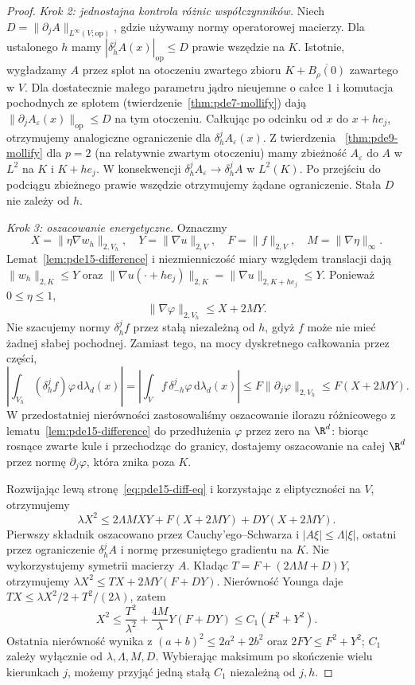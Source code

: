 \begin{proof}
\emph{Krok 2: jednostajna kontrola różnic współczynników.}
Niech $D=\|\partial_jA\|_{L^\infty(V;\mathrm{op})}$,
gdzie używamy normy operatorowej macierzy. Dla ustalonego
$h$ mamy $|\delta_h^jA(x)|_{\mathrm{op}}\le D$ prawie
wszędzie na $K$. Istotnie, wygładzamy $A$ przez splot
na otoczeniu zwartego zbioru $K+\overline{B_\rho(0)}$
zawartego w $V$. Dla dostatecznie małego parametru
jądro nieujemne o całce $1$ i komutacja pochodnych
ze splotem (twierdzenie~\ref{thm:pde7-mollify})
dają $\|\partial_j A_\varepsilon(x)\|_{\mathrm{op}}\le D$
na tym otoczeniu. Całkując po odcinku od $x$ do $x+he_j$,
otrzymujemy analogiczne ograniczenie dla
$\delta_h^j A_\varepsilon(x)$. Z twierdzenia
~\ref{thm:pde9-mollify} dla $p=2$ (na relatywnie zwartym
otoczeniu) mamy zbieżność $A_\varepsilon$ do $A$ w $L^2$
na $K$ i $K+he_j$. W konsekwencji
$\delta_h^j A_\varepsilon\to\delta_h^j A$ w $L^2(K)$.
Po przejściu do podciągu zbieżnego prawie wszędzie
otrzymujemy żądane ograniczenie. Stała $D$ nie zależy od $h$.

\emph{Krok 3: oszacowanie energetyczne.}
Oznaczmy
\[
 X=\|\eta\nabla w_h\|_{2,V_h},\quad
 Y=\|\nabla u\|_{2,V},\quad F=\|f\|_{2,V},
 \quad M=\|\nabla\eta\|_\infty .
\]
Lemat~\ref{lem:pde15-difference} i niezmienniczość miary
względem translacji dają
$\|w_h\|_{2,K}\le Y$ oraz
$\|\nabla u(\cdot+he_j)\|_{2,K}
=\|\nabla u\|_{2,K+he_j}\le Y$.
Ponieważ $0\le\eta\le1$,
\[
 \|\nabla\varphi\|_{2,V_h}\le X+2MY.
\]
Nie szacujemy normy $\delta_h^jf$ przez stałą niezależną
od $h$, gdyż $f$ może nie mieć żadnej słabej pochodnej.
Zamiast tego, na mocy dyskretnego całkowania przez części,
\[
 \left|\int_{V_h}(\delta_h^jf)\varphi\,\mathrm d\lambda_d(x)\right|
 =\left|\int_V f\,\delta_{-h}^j\varphi\,\mathrm d\lambda_d(x)\right|
 \le F\|\partial_j\varphi\|_{2,V_h}
 \le F(X+2MY).
\]
W przedostatniej nierówności zastosowaliśmy oszacowanie
ilorazu różnicowego z lematu~\ref{lem:pde15-difference}
do przedłużenia $\varphi$ przez zero na $\R^d$:
biorąc rosnące zwarte kule i przechodząc do granicy,
dostajemy oszacowanie na całej $\R^d$ przez normę
$\partial_j\varphi$, która znika poza $K$.

Rozwijając lewą stronę~\eqref{eq:pde15-diff-eq}
i korzystając z eliptyczności na $V$, otrzymujemy
\[
 \lambda X^2
 \le 2\Lambda MXY+F(X+2MY)+DY(X+2MY).
\]
Pierwszy składnik oszacowano przez Cauchy'ego--Schwarza
i $|A\xi|\le\Lambda|\xi|$, ostatni przez ograniczenie
$\delta_h^j A$ i normę przesuniętego gradientu na $K$.
Nie wykorzystujemy symetrii macierzy $A$.
Kładąc $T=F+(2\Lambda M+D)Y$, otrzymujemy
$\lambda X^2\le TX+2MY(F+DY)$.
Nierówność Younga daje
$TX\le\lambda X^2/2+T^2/(2\lambda)$, zatem
\[
 X^2\le \frac{T^2}{\lambda^2}
       +\frac{4M}{\lambda}Y(F+DY)
 \le C_1(F^2+Y^2).
\]
Ostatnia nierówność wynika z
$(a+b)^2\le2a^2+2b^2$ oraz $2FY\le F^2+Y^2$;
$C_1$ zależy wyłącznie od $\lambda,\Lambda,M,D$.
Wybierając maksimum po skończenie wielu kierunkach $j$,
możemy przyjąć jedną stałą $C_1$ niezależną od $j,h$.


\end{proof}

